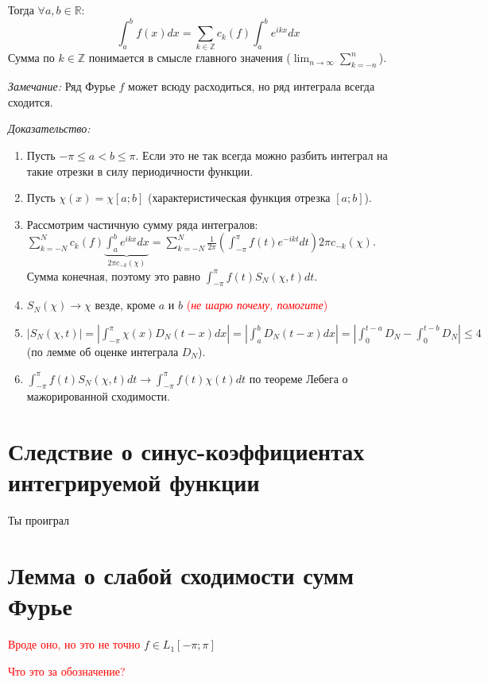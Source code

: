 \documentclass[paper=a4, fontsize=14pt]{report}
\begin{document}
    Тогда $\forall a, b \in \mathbb{R}$:
    $$\int_a^b f(x)dx = \sum_{k\in\mathbb{Z}} c_k(f) \int_a^b e^{ikx} dx$$
    Сумма по $k \in \mathbb{Z}$ понимается в смысле главного значения ($\lim_{n \to \infty} \sum_{k=-n}^n$).

    \emph{Замечание:} Ряд Фурье $f$ может всюду расходиться, но ряд интеграла всегда сходится.
    
    
	    \emph{Доказательство:}

\begin{enumerate}
    \item Пусть $-\pi \leq a < b \leq \pi$. Если это не так всегда можно разбить интеграл на такие отрезки в силу периодичности функции.
    \item Пусть $\chi(x) = \chi[a;b]$ (характеристическая функция отрезка $[a;b]$).
    \item Рассмотрим частичную сумму ряда интегралов:\\
        $\sum_{k=-N}^N c_k(f) \underbrace{\int_a^b e^{ikx} dx}_{2\pi c_{-k}(\chi)} =
        \sum_{k=-N}^N \frac{1}{2\pi} (\int_{-\pi}^\pi f(t) e^{-ikt} dt) 2\pi c_{-k}(\chi)$.\\
        Сумма конечная, поэтому это равно $\int_{-\pi}^{\pi} f(t) S_N(\chi,t) dt$.
    \item $S_N(\chi) \to \chi$ везде, кроме $a$ и $b$ \textcolor{red}{(\emph{не шарю почему, помогите})}
    \item $|S_N(\chi,t)| = |\int_{-\pi}^\pi \chi(x)D_N(t-x)dx| = |\int_a^b D_N(t-x)dx| =
        |\int_0^{t-a}D_N - \int_0^{t-b}D_N| \leq 4$ (по лемме об оценке интеграла $D_N$).
    \item $\int_{-\pi}^\pi f(t)S_N(\chi,t) dt \to \int_{-\pi}^\pi f(t) \chi(t) dt$ по теореме Лебега о мажорированной сходимости.
\end{enumerate}
    
    \section{Следствие о синус-коэффициентах интегрируемой функции}
    Ты проиграл
    
    \section{Лемма о слабой сходимости сумм Фурье}
    \textcolor{red}{Вроде оно, но это не точно}
    $f \in L_1[-\pi;\pi]$

\textcolor{red}{Что это за обозначение?}
\end{document}
